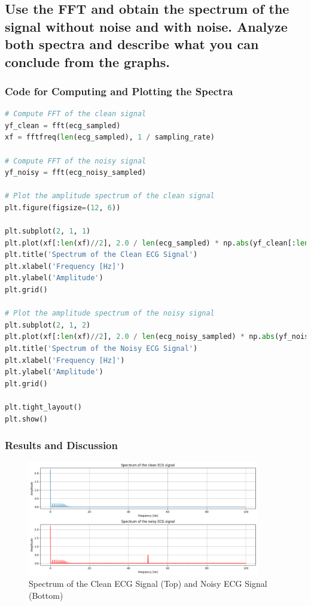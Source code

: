 \documentclass[10pt]{article}
\theoremstyle{definition}
\theoremstyle{remark}
\theoremstyle{definition}
\numberwithin{equation}{prob}
\begin{document}
\subsection{Use the FFT and obtain the spectrum of the signal without noise and with noise. Analyze both spectra and describe what you can conclude from the graphs.}

\subsubsection*{Code for Computing and Plotting the Spectra}

\begin{lstlisting}[language=Python]
# Compute FFT of the clean signal
yf_clean = fft(ecg_sampled)
xf = fftfreq(len(ecg_sampled), 1 / sampling_rate)

# Compute FFT of the noisy signal
yf_noisy = fft(ecg_noisy_sampled)

# Plot the amplitude spectrum of the clean signal
plt.figure(figsize=(12, 6))

plt.subplot(2, 1, 1)
plt.plot(xf[:len(xf)//2], 2.0 / len(ecg_sampled) * np.abs(yf_clean[:len(yf_clean)//2]))
plt.title('Spectrum of the Clean ECG Signal')
plt.xlabel('Frequency [Hz]')
plt.ylabel('Amplitude')
plt.grid()

# Plot the amplitude spectrum of the noisy signal
plt.subplot(2, 1, 2)
plt.plot(xf[:len(xf)//2], 2.0 / len(ecg_noisy_sampled) * np.abs(yf_noisy[:len(yf_noisy)//2]), color='r')
plt.title('Spectrum of the Noisy ECG Signal')
plt.xlabel('Frequency [Hz]')
plt.ylabel('Amplitude')
plt.grid()

plt.tight_layout()
plt.show()
\end{lstlisting}

\subsubsection*{Results and Discussion}

\begin{figure}[H]
    \centering
    \includegraphics[width=0.9\textwidth]{./figures/ecg_spectra.png}
    \caption{Spectrum of the Clean ECG Signal (Top) and Noisy ECG Signal (Bottom)}
\end{figure}
\end{document}
